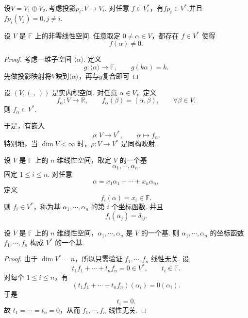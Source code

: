 \begin{example}
	设$V=V_1\oplus V_2,$考虑投影$p_i:V\longrightarrow V_i.$
	对任意 $f\in V_i^*$，有$fp_i\in V^*.$并且$fp_i(V_j)=0, j\neq i.$
\end{example}

\begin{example}
	设 $V$ 是 $\mathbb{F}$ 上的非零线性空间. 任意取定 $0\ne \alpha\in V$，都存在 $f\in V^*$ 使得
	\[
	f(\alpha)\ne0.
	\]
\end{example}

\begin{proof}
	考虑一维子空间 $\langle\alpha\rangle$. 定义
	\[
	g:\langle\alpha\rangle\longrightarrow \mathbb{F},\qquad g(k\alpha)=k.
	\]
	先做投影映射将$V$映到$\langle \alpha \rangle$，再与$g$复合即可 
\end{proof}

\begin{example}
	设 $(V,(\ ,\ ))$ 是实内积空间. 对任意 $\alpha\in V$，定义
	\[
	f_\alpha:V\longrightarrow \mathbb{R},\qquad f_\alpha(\beta)=(\alpha,\beta),\qquad \forall \beta\in V.
	\]
	则 $f_\alpha\in V^*$.
	
	于是，有嵌入
	\[
	\rho:V\longrightarrow V^*,\qquad \alpha\longmapsto f_\alpha.
	\]
	特别地，当 $\dim V<\infty$ 时，$\rho:V\to V^*$ 是同构映射.
\end{example}



\begin{definition}
		设 $V$ 是 $\mathbb{F}$ 上的 $n$ 维线性空间，取定 $V$ 的一个基
	\[
	\alpha_1,\cdots,\alpha_n.
	\]
	固定 $1\leq i\leq n$. 对任意
	\[
	\alpha=x_1\alpha_1+\cdots+x_n\alpha_n,
	\]
	定义
	\[
	f_i(\alpha)=x_i\in \mathbb{F}.
	\]
	则 $f_i\in V^*$，称为基 $\alpha_1,\cdots,\alpha_n$ 的第 $i$ 个坐标函数. 并且
	\[
	f_i(\alpha_j)=\delta_{ij}.
	\]

\end{definition}

\begin{lemma}
	设 $V$ 是 $\mathbb{F}$ 上的 $n$ 维线性空间，$\alpha_1,\cdots,\alpha_n$ 是 $V$ 的一个基.
	则 $\alpha_1,\cdots,\alpha_n$ 的坐标函数 $f_1,\cdots,f_n$ 构成 $V^*$ 的一个基.
\end{lemma}

\begin{proof}
	由于 $\dim V^*=n$，所以只需验证 $f_1,\cdots,f_n$ 线性无关.
	设
	\[
	t_1f_1+\cdots+t_nf_n=0\in V^*,\qquad t_i\in\mathbb{F}.
	\]
	对每个 $1\leq i\leq n$，有
	\[
	(t_1f_1+\cdots+t_nf_n)(\alpha_i)=0(\alpha_i).
	\]
	于是
	\[
	t_i=0.
	\]
	故 $t_1=\cdots=t_n=0$，从而 $f_1,\cdots,f_n$ 线性无关.
\end{proof}


